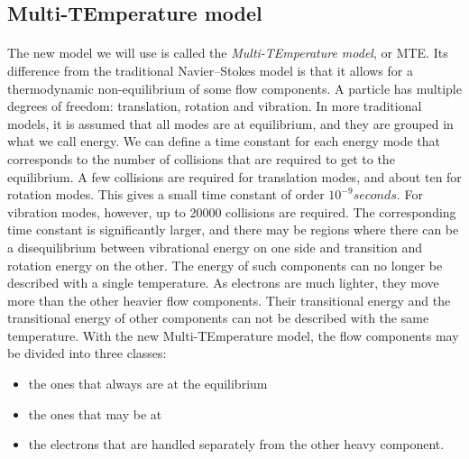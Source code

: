     \subsection{Multi-TEmperature model}

      \paragraph{}
      The new model we will use is called the \emph{Multi-TEmperature model}, or MTE.
      Its difference from the traditional Navier--Stokes model is that it allows for a thermodynamic non-equilibrium of some flow components.
      A particle has multiple degrees of freedom: translation, rotation and vibration.
      In more traditional models, it is assumed that all modes are at equilibrium, and they are grouped in what we call energy.
      We can define a time constant for each energy mode that corresponds to the number of collisions that are required to get to the equilibrium.
      A few collisions are required for translation modes, and about ten for rotation modes.
      This gives a small time constant of order $10^{-9}\si{seconds}$.
      For vibration modes, however, up to \num{20000} collisions are required.
      The corresponding time constant is significantly larger, and there may be regions where there can be a disequilibrium between vibrational energy on one side and transition and rotation energy on the other.
      The energy of such components can no longer be described with a single temperature.
      As electrons are much lighter, they move more than the other heavier flow components.
      Their transitional energy and the transitional energy of other components can not be described with the same temperature.
      With the new Multi-TEmperature model, the flow components may be divided into three classes:
      \begin{itemize}
        \item the ones that always are at the equilibrium
        \item the ones that may be at 
        \item the electrons that are handled separately from the other heavy component.
      \end{itemize}

